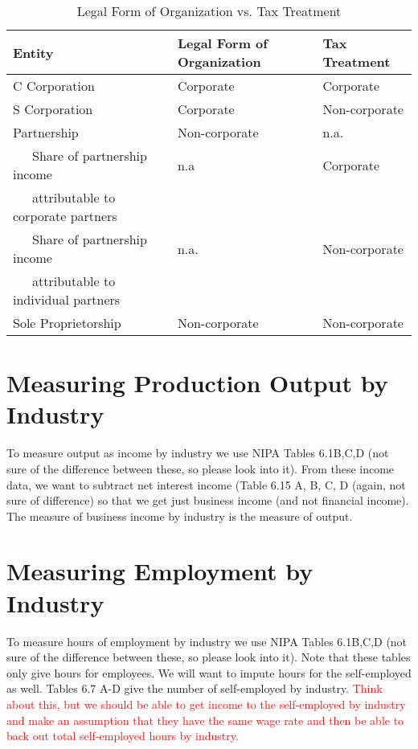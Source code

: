 \documentclass[article,11pt,letterpaper,fleqn]{article}
\theoremstyle{definition}
\numberwithin{equation}{section}
\begin{document}
\begin{table}[htbp]
  \centering
  \caption{Legal Form of Organization vs. Tax Treatment}
    \begin{tabular}{lll}
    \hline
    \hline
    Entity & Legal Form of Organization & Tax Treatment \\
   \hline
    C Corporation & Corporate & Corporate \\
    S Corporation & Corporate & Non-corporate \\
    Partnership & Non-corporate & n.a. \\
    \ \ \ Share of partnership income & n.a   & Corporate \\
    \ \ \ attributable to corporate partners & &  \\
    \ \ \ Share of partnership income& n.a.  & Non-corporate \\
    \ \ \ attributable to individual partners &  &  \\
    Sole Proprietorship & Non-corporate & Non-corporate \\
    \hline
    \hline
    \end{tabular}%
  \label{tab:org_form}%
\end{table}%


\section{Measuring Production Output by Industry}
\label{sec:step3}

To measure output as income by industry we use NIPA Tables 6.1B,C,D (not sure of the difference between these, so please look into it). From these income data, we want to subtract net interest income (Table 6.15 A, B, C, D (again, not sure of difference) so that we get just business income (and not financial income).  The measure of business income by industry is the measure of output.


\section{Measuring Employment by Industry}
\label{sec:step3}

To measure hours of employment by industry we use NIPA Tables 6.1B,C,D (not sure of the difference between these, so please look into it).   Note that these tables only give hours for employees.  We will want to impute hours for the self-employed as well.  Tables 6.7 A-D give the number of self-employed by industry.  \textcolor{red}{Think about this, but we should be able to get income to the self-employed by industry and make an assumption that they have the same wage rate and then be able to back out total self-employed hours by industry.}
\end{document}
